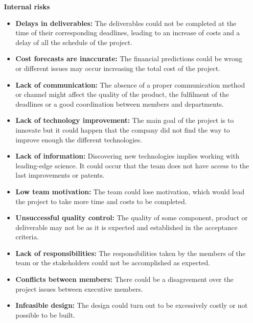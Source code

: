 \textbf{Internal risks}

\begin{itemize}
	
	\item \textbf{Delays in deliverables:} The deliverables could not be completed at the time of their corresponding deadlines, leading to an increase of costs and a delay of all the schedule of the project.
	
	\item \textbf{Cost forecasts are inaccurate:} The financial predictions could be wrong or different issues may occur increasing the total cost of the project.
	
	\item \textbf{Lack of communication:} The absence of a proper communication method or channel might affect the quality of the product, the fulfilment of the deadlines or a good coordination between members and departments.
	
	\item \textbf{Lack of technology improvement:} The main goal of the project is to innovate but it could happen that the company did not find the way to improve enough the different technologies.
	
	\item \textbf{Lack of information:} Discovering new technologies implies working with leading-edge science. It could occur that the team does not have access to the last improvements or patents.
	
	\item \textbf{Low team motivation:} The team could lose motivation, which would lead the project to take more time and costs to be completed.
	
	\item \textbf{Unsuccessful quality control:} The quality of some component, product or deliverable may not be as it is expected and established in the acceptance criteria.
	
	\item \textbf{Lack of responsibilities:} The responsibilities taken by the members of the team or the stakeholders could not be accomplished as expected.
	
	\item \textbf{Conflicts between members:} There could be a disagreement over the project issues between executive members.
	
	\item \textbf{Infeasible design:} The design could turn out to be excessively costly or not possible to be built.
	

\end{itemize}
